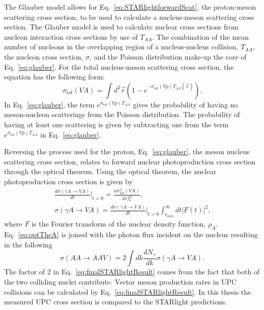     The Glauber model allows for Eq.~\ref{eq:STARlightforwardScat}, the proton-meson
      scattering cross section, to be used to calculate a nucleus-meson 
      scattering cross section. 
    The Glauber model is used to calculate nuclear cross sections from 
      nucleon interaction cross sections by use of $T_{AA}$. 
    The combination of the mean number of nucleons in the overlapping region
      of a nucleus-nucleus collision, $T_{AA}$, the nucleon cross section, 
      $\sigma$, and the Poisson distribution make-up the core of 
      Eq.~\ref{eq:glauber}. 
    For the total nucleus-meson scattering cross section, the equation has the 
      following form:
    \begin{equation} \label{eq:glauber}
      \sigma_{tot}(VA)=\int d^{2}\vec{r}(1-e^{-\sigma_{tot}(Vp)T_{AA}(\vec{r})}).
    \end{equation}
    In Eq.~\ref{eq:glauber}, the term $e^{\sigma_{tot}(Vp)T_{AA}}$ gives the
      probability of having no meson-nucleon scatterings from the Poisson 
      distribution. 
    The probability of having at least one scattering is given by subtracting 
      one from the term  $e^{\sigma_{tot}(Vp)T_{AA}}$ in Eq.~\ref{eq:glauber}.

    Reversing the process used for the proton, Eq.~\ref{eq:glauber}, the meson 
      nucleus scattering cross section, relates to forward nuclear 
      photoproduction cross section through the optical theorem. 
    Using the optical theorem, the nuclear photoproduction cross section is 
      given by 
    \begin{eqnarray} \label{eq:optTheA}
      \frac{d\sigma(\gamma A\rightarrow VA)}{dt}\Big|_{t=0}=
      \frac{\alpha\sigma_{tot}^{2}(VA)}{4\pi f_{v}^{2}}\nonumber \textrm{,}\\
      \sigma(\gamma A\rightarrow VA)=\frac{d\sigma(\gamma A\rightarrow VA)}{dt}
      \Big|_{t=0}\int_{t_{min}}^{\infty}dt|F(t)|^{2} \textrm{,}
    \end{eqnarray}
    where $F$ is the Fourier transform of the nuclear density function, 
      $\rho_{A}$.
    Eq.~\ref{eq:optTheA} is joined with the photon flux incident on the nucleus 
      resulting in the following
    \begin{equation} \label{eq:finalSTARlightResult}
      \sigma(AA\rightarrow AAV)=2\int{dk\frac{dN_{\gamma}}{dk}
                    \sigma(\gamma A\rightarrow VA)}.
    \end{equation}
    The factor of 2 in Eq.~\ref{eq:finalSTARlightResult} comes from the fact that 
      both of the two colliding nuclei contribute. 
    Vector meson production rates in UPC collisions can be calculated
      by Eq.~\ref{eq:finalSTARlightResult}.
    In this thesis the measured UPC \JPsi{} cross section is compared to the
      STARlight predictions. 

